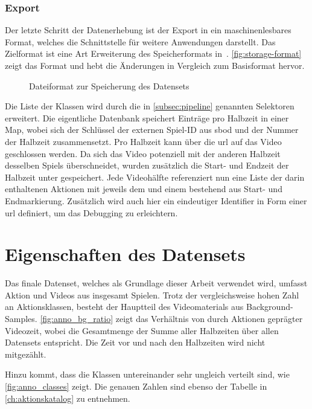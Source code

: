 \subsubsection{Export}

Der letzte Schritt der Datenerhebung ist der Export in ein maschinenlesbares Format, welches die Schnittstelle für weitere Anwendungen darstellt.
Das Zielformat ist eine Art Erweiterung des Speicherformats in~\cite{Caba15}.
\autoref{fig:storage-format} zeigt das Format und hebt die Änderungen in Vergleich zum Basisformat hervor.

\begin{figure}
    \centering
    \caption{Dateiformat zur Speicherung des Datensets}
    \label{fig:storage-format}
\end{figure}

Die Liste der Klassen wird durch die in \autoref{subsec:pipeline} genannten Selektoren erweitert.
Die eigentliche Datenbank speichert Einträge pro Halbzeit in einer Map, wobei sich der Schlüssel der externen Spiel-ID aus \gls{sbod} und der Nummer der Halbzeit zusammensetzt.
Pro Halbzeit kann über die \gls{url} auf das Video geschlossen werden.
Da sich das Video potenziell mit der anderen Halbzeit desselben Spiels überschneidet, wurden zusätzlich die Start- und Endzeit der Halbzeit unter  gespeichert.
Jede Videohälfte referenziert nun eine Liste der darin enthaltenen Aktionen mit jeweils dem  und einem  bestehend aus Start- und Endmarkierung.
Zusätzlich wird auch hier ein eindeutiger Identifier in Form einer \gls{url} definiert, um das Debugging zu erleichtern.

\section{Eigenschaften des Datensets}
\label{sec:eigenschaften-des-datensets}

Das finale Datenset, welches als Grundlage dieser Arbeit verwendet wird, umfasst \noaction Aktion und \novideos Videos aus insgesamt \nomatches Spielen.
Trotz der vergleichsweise hohen Zahl an Aktionsklassen, besteht der Hauptteil des Videomaterials aus Background-Samples.
\autoref{fig:anno_bg_ratio} zeigt das Verhältnis von durch Aktionen geprägter Videozeit, wobei die Gesamtmenge der Summe aller Halbzeiten über allen Datensets entspricht.
Die Zeit vor und nach den Halbzeiten wird nicht mitgezählt.

Hinzu kommt, dass die Klassen untereinander sehr ungleich verteilt sind, wie \autoref{fig:anno_classes} zeigt.
Die genauen Zahlen sind ebenso der Tabelle in \autoref{ch:aktionskatalog} zu entnehmen.

